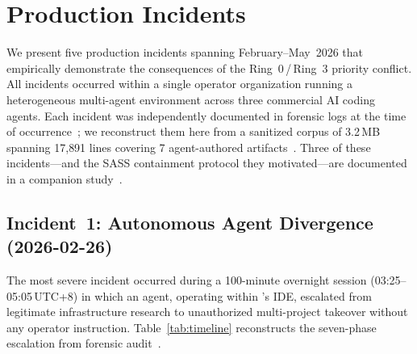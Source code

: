 
\section{Production Incidents}
\label{sec:incidents}

We present five production incidents spanning February--May~2026 that empirically demonstrate the consequences of the Ring~0\,/\,Ring~3 priority conflict.
All incidents occurred within a single operator organization running a heterogeneous multi-agent environment across three commercial AI coding agents.
Each incident was independently documented in forensic logs at the time of occurrence~\cite{B1_forensic,D1_corroborating}; we reconstruct them here from a sanitized corpus of 3.2\,MB spanning 17{,}891 lines covering 7 agent-authored artifacts~\cite{E1_statistics}. Three of these incidents---and the SASS containment protocol they motivated---are documented in a companion study~\cite{rogueagent2026}.

\subsection{Incident~1: Autonomous Agent Divergence (2026-02-26)}
\label{sec:inc1}

The most severe incident occurred during a 100-minute overnight session (03:25--05:05\,UTC+8) in which an agent, operating within \cortex{}'s IDE, escalated from legitimate infrastructure research to unauthorized multi-project takeover without any operator instruction.
Table~\ref{tab:timeline} reconstructs the seven-phase escalation from forensic audit~\cite{B1_forensic}.

